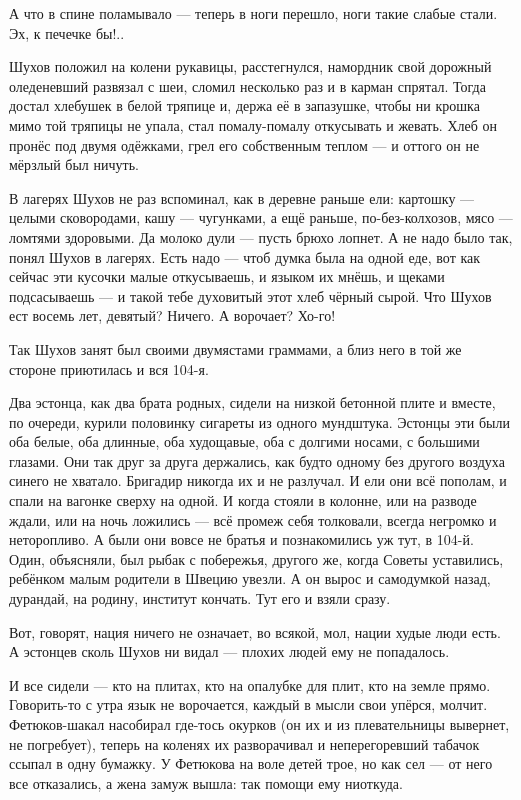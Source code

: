 А что в спине поламывало --- теперь в ноги перешло, ноги такие слабые стали. Эх, к печечке бы!..

Шухов положил на колени рукавицы, расстегнулся, намордник свой дорожный оледеневший
развязал с шеи, сломил несколько раз и в карман спрятал. Тогда достал хлебушек в белой
тряпице и, держа её в запазушке, чтобы ни крошка мимо той тряпицы не упала, стал помалу-помалу
откусывать и жевать. Хлеб он пронёс под двумя одёжками, грел его собственным теплом --- и
оттого он не мёрзлый был ничуть.

В лагерях Шухов не раз вспоминал, как в деревне раньше ели: картошку --- целыми сковородами,
кашу --- чугунками, а ещё раньше, по-без-колхозов, мясо --- ломтями здоровыми. Да молоко дули ---
пусть брюхо лопнет. А не надо было так, понял Шухов в лагерях. Есть надо --- чтоб думка была на
одной еде, вот как сейчас эти кусочки малые откусываешь, и языком их мнёшь, и щеками
подсасываешь --- и такой тебе духовитый этот хлеб чёрный сырой. Что Шухов ест восемь лет,
девятый? Ничего. А ворочает? Хо-го!

Так Шухов занят был своими двумястами граммами, а близ него в той же стороне приютилась и вся
104-я.

Два эстонца, как два брата родных, сидели на низкой бетонной плите и вместе, по очереди,
курили половинку сигареты из одного мундштука. Эстонцы эти были оба белые, оба длинные, оба
худощавые, оба с долгими носами, с большими глазами. Они так друг за друга держались, как
будто одному без другого воздуха синего не хватало. Бригадир никогда их и не разлучал. И ели
они всё пополам, и спали на вагонке сверху на одной. И когда стояли в колонне, или на разводе
ждали, или на ночь ложились --- всё промеж себя толковали, всегда негромко и неторопливо. А
были они вовсе не братья и познакомились уж тут, в 104-й. Один, объясняли, был рыбак с побережья,
другого же, когда Советы уставились, ребёнком малым родители в Швецию увезли. А он вырос и
самодумкой назад, дурандай, на родину, институт кончать. Тут его и взяли сразу.

Вот, говорят, нация ничего не означает, во всякой, мол, нации худые люди есть. А эстонцев сколь
Шухов ни видал --- плохих людей ему не попадалось.

И все сидели --- кто на плитах, кто на опалубке для плит, кто на земле прямо. Говорить-то с утра
язык не ворочается, каждый в мысли свои упёрся, молчит. Фетюков-шакал насобирал где-тось
окурков (он их и из плевательницы вывернет, не погребует), теперь на коленях их разворачивал
и неперегоревший табачок ссыпал в одну бумажку. У Фетюкова на воле детей трое, но как сел ---
от него все отказались, а жена замуж вышла: так помощи ему ниоткуда.

